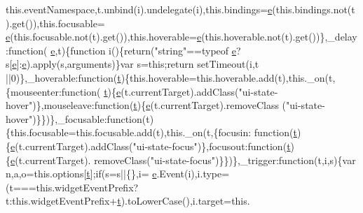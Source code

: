 \begin{DoxyCode}
      this.eventNamespace,t.unbind(i).undelegate(i),this.bindings=\hyperlink{jquery-ui_8min_8js_a2c038346d47955cbe2cb91e338edd7e1}{e}(this.bindings.not(t).get()),this.focusable=
      \hyperlink{jquery-ui_8min_8js_a2c038346d47955cbe2cb91e338edd7e1}{e}(this.focusable.not(t).get()),this.hoverable=\hyperlink{jquery-ui_8min_8js_a2c038346d47955cbe2cb91e338edd7e1}{e}(this.hoverable.not(t).get())\},\_delay:\textcolor{keyword}{function}(
      \hyperlink{jquery-ui_8min_8js_a2c038346d47955cbe2cb91e338edd7e1}{e},t)\{\textcolor{keyword}{function} i()\{\textcolor{keywordflow}{return}(\textcolor{stringliteral}{"string"}==typeof \hyperlink{jquery-ui_8min_8js_a2c038346d47955cbe2cb91e338edd7e1}{e}?s[\hyperlink{jquery-ui_8min_8js_a2c038346d47955cbe2cb91e338edd7e1}{e}]:\hyperlink{jquery-ui_8min_8js_a2c038346d47955cbe2cb91e338edd7e1}{e}).apply(s,arguments)\}var s=\textcolor{keyword}{this};\textcolor{keywordflow}{return} setTimeout(i,t
      ||0)\},\_hoverable:\textcolor{keyword}{function}(\hyperlink{jquery-2_80_83_8min_8js_aaccc9105df5383111407fd5b41255e23}{t})\{this.hoverable=this.hoverable.add(t),this.\_on(t,\{mouseenter:\textcolor{keyword}{function}(
      \hyperlink{jquery-2_80_83_8min_8js_aaccc9105df5383111407fd5b41255e23}{t})\{\hyperlink{jquery-ui_8min_8js_a2c038346d47955cbe2cb91e338edd7e1}{e}(t.currentTarget).addClass(\textcolor{stringliteral}{"ui-state-hover"})\},mouseleave:\textcolor{keyword}{function}(\hyperlink{jquery-2_80_83_8min_8js_aaccc9105df5383111407fd5b41255e23}{t})\{\hyperlink{jquery-ui_8min_8js_a2c038346d47955cbe2cb91e338edd7e1}{e}(t.currentTarget).removeClass
      (\textcolor{stringliteral}{"ui-state-hover"})\}\})\},\_focusable:\textcolor{keyword}{function}(t)\{this.focusable=this.focusable.add(t),this.\_on(t,\{focusin:\textcolor{keyword}{
      function}(\hyperlink{jquery-2_80_83_8min_8js_aaccc9105df5383111407fd5b41255e23}{t})\{\hyperlink{jquery-ui_8min_8js_a2c038346d47955cbe2cb91e338edd7e1}{e}(t.currentTarget).addClass(\textcolor{stringliteral}{"ui-state-focus"})\},focusout:\textcolor{keyword}{function}(\hyperlink{jquery-2_80_83_8min_8js_aaccc9105df5383111407fd5b41255e23}{t})\{\hyperlink{jquery-ui_8min_8js_a2c038346d47955cbe2cb91e338edd7e1}{e}(t.currentTarget).
      removeClass(\textcolor{stringliteral}{"ui-state-focus"})\}\})\},\_trigger:\textcolor{keyword}{function}(t,i,s)\{var n,a,o=this.options[\hyperlink{jquery-2_80_83_8min_8js_aaccc9105df5383111407fd5b41255e23}{t}];\textcolor{keywordflow}{if}(s=s||\{\},i=
      \hyperlink{jquery-ui_8min_8js_a2c038346d47955cbe2cb91e338edd7e1}{e}.Event(i),i.type=(t===this.widgetEventPrefix?t:this.widgetEventPrefix+\hyperlink{jquery-2_80_83_8min_8js_aaccc9105df5383111407fd5b41255e23}{t}).toLowerCase(),i.target=this.

\end{DoxyCode}
